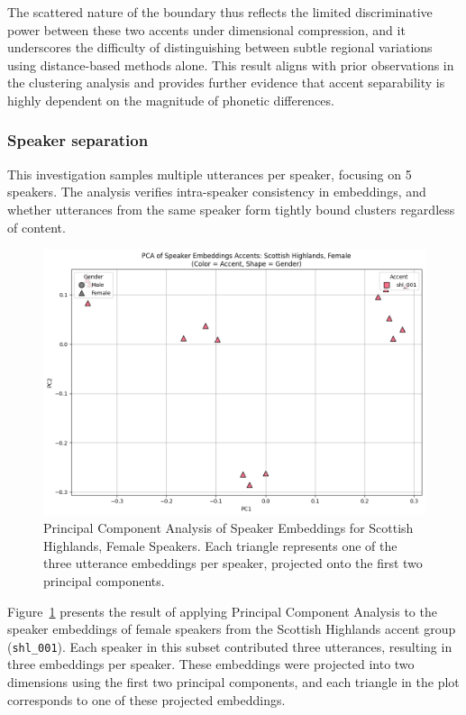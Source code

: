 \documentclass[conference]{IEEEtran}
\begin{document}
The scattered nature of the boundary thus reflects the limited discriminative power between these two accents under dimensional compression, and it underscores the difficulty of distinguishing between subtle regional variations using distance-based methods alone. This result aligns with prior observations in the clustering analysis and provides further evidence that accent separability is highly dependent on the magnitude of phonetic differences.






\bigskip



\subsubsection{Speaker separation}
This investigation samples multiple utterances per speaker, focusing on 5 speakers. The analysis verifies intra-speaker consistency in embeddings, and whether utterances from the same speaker form tightly bound clusters regardless of content.



\begin{figure}[h]
	\centering
	\includegraphics[width=0.85\linewidth]{img/img-cluster-speaker-separation.png}
	\caption{Principal Component Analysis of Speaker Embeddings for Scottish Highlands, Female Speakers. Each triangle represents one of the three utterance embeddings per speaker, projected onto the first two principal components.}
	\label{fig:pca-shl-female}
\end{figure}


Figure~\ref{fig:pca-shl-female} presents the result of applying Principal Component Analysis to the speaker embeddings of female speakers from the Scottish Highlands accent group (\texttt{shl\_001}). Each speaker in this subset contributed three utterances, resulting in three embeddings per speaker. These embeddings were projected into two dimensions using the first two principal components, and each triangle in the plot corresponds to one of these projected embeddings.
\end{document}
